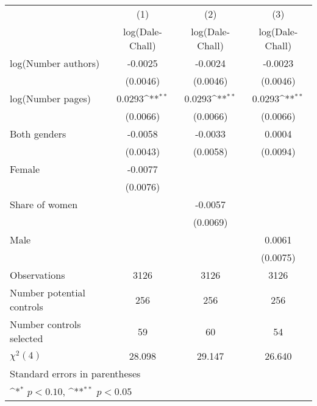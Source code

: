 {
\def\sym#1{\ifmmode^{#1}\else\(^{#1}\)\fi}
\begin{tabular}{l*{3}{c}}
\hline\hline
                    &\multicolumn{1}{c}{(1)}&\multicolumn{1}{c}{(2)}&\multicolumn{1}{c}{(3)}\\
                    &\multicolumn{1}{c}{log(Dale-Chall)}&\multicolumn{1}{c}{log(Dale-Chall)}&\multicolumn{1}{c}{log(Dale-Chall)}\\
\hline
\hspace{3mm}log(Number authors)&     -0.0025        &     -0.0024        &     -0.0023        \\
                    &    (0.0046)        &    (0.0046)        &    (0.0046)        \\
[1em]
\hspace{3mm}log(Number pages)&      0.0293\sym{**}&      0.0293\sym{**}&      0.0293\sym{**}\\
                    &    (0.0066)        &    (0.0066)        &    (0.0066)        \\
[1em]
\hspace{3mm}Both genders&     -0.0058        &     -0.0033        &      0.0004        \\
                    &    (0.0043)        &    (0.0058)        &    (0.0094)        \\
[1em]
\hspace{3mm}Female  &     -0.0077        &                    &                    \\
                    &    (0.0076)        &                    &                    \\
[1em]
\hspace{3mm}Share of women&                    &     -0.0057        &                    \\
                    &                    &    (0.0069)        &                    \\
[1em]
\hspace{3mm}Male    &                    &                    &      0.0061        \\
                    &                    &                    &    (0.0075)        \\
\hline
Observations        &        3126        &        3126        &        3126        \\
Number potential controls&         256        &         256        &         256        \\
Number controls selected&          59        &          60        &          54        \\
$\chi^2(4)$         &      28.098        &      29.147        &      26.640        \\
\hline\hline
\multicolumn{4}{l}{\footnotesize Standard errors in parentheses}\\
\multicolumn{4}{l}{\footnotesize \sym{*} \(p<0.10\), \sym{**} \(p<0.05\)}\\
\end{tabular}
}
